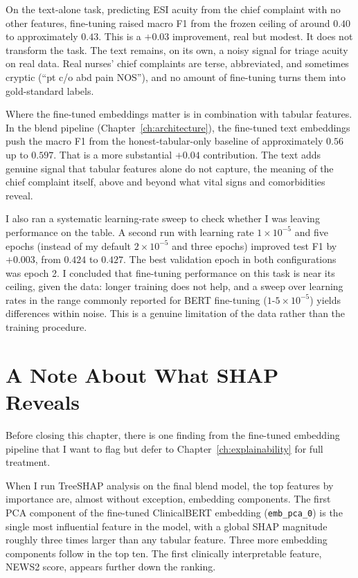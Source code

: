 On the text-alone task, predicting ESI acuity from the chief complaint with no other features, fine-tuning raised macro F1 from the frozen ceiling of around $0.40$ to approximately $0.43$. This is a $+0.03$ improvement, real but modest. It does not transform the task. The text remains, on its own, a noisy signal for triage acuity on real data. Real nurses' chief complaints are terse, abbreviated, and sometimes cryptic (``pt c/o abd pain NOS''), and no amount of fine-tuning turns them into gold-standard labels.

Where the fine-tuned embeddings matter is in combination with tabular features. In the blend pipeline (Chapter~\ref{ch:architecture}), the fine-tuned text embeddings push the macro F1 from the honest-tabular-only baseline of approximately $0.56$ up to $0.597$. That is a more substantial $+0.04$ contribution. The text adds genuine signal that tabular features alone do not capture, the meaning of the chief complaint itself, above and beyond what vital signs and comorbidities reveal.

I also ran a systematic learning-rate sweep to check whether I was leaving performance on the table. A second run with learning rate $1 \times 10^{-5}$ and five epochs (instead of my default $2 \times 10^{-5}$ and three epochs) improved test F1 by $+0.003$, from $0.424$ to $0.427$. The best validation epoch in both configurations was epoch 2. I concluded that fine-tuning performance on this task is near its ceiling, given the data: longer training does not help, and a sweep over learning rates in the range commonly reported for BERT fine-tuning ($1$-$5 \times 10^{-5}$) yields differences within noise. This is a genuine limitation of the data rather than the training procedure.

\section{A Note About What SHAP Reveals}

Before closing this chapter, there is one finding from the fine-tuned embedding pipeline that I want to flag but defer to Chapter~\ref{ch:explainability} for full treatment.

When I run TreeSHAP analysis on the final blend model, the top features by importance are, almost without exception, embedding components. The first PCA component of the fine-tuned ClinicalBERT embedding (\texttt{emb\_pca\_0}) is the single most influential feature in the model, with a global SHAP magnitude roughly three times larger than any tabular feature. Three more embedding components follow in the top ten. The first clinically interpretable feature, NEWS2 score, appears further down the ranking.

